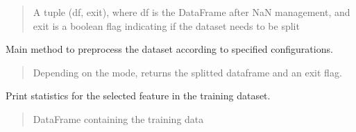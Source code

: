 \documentclass[letterpaper,10pt,english]{sphinxmanual}
\begin{document}
\begin{fulllineitems}
\begin{fulllineitems}
\begin{quote}
\begin{description}
\sphinxAtStartPar
A tuple (df, exit), where df is the DataFrame after NaN management, and exit is a boolean flag indicating if the dataset needs to be split

\end{description}\end{quote}

\end{fulllineitems}


\begin{fulllineitems}
\label{\detokenize{docs/data_preprocessing:data_preprocessing.DataPreprocessor.preprocess_data}}
\pysigstartsignatures
{}
\pysigstopsignatures
\sphinxAtStartPar
Main method to preprocess the dataset according to specified configurations.
\begin{quote}\begin{description}
\sphinxAtStartPar
Depending on the mode, returns the splitted dataframe and an exit flag.

\end{description}\end{quote}

\end{fulllineitems}


\begin{fulllineitems}
\label{\detokenize{docs/data_preprocessing:data_preprocessing.DataPreprocessor.print_stats}}
\pysigstartsignatures
{}
\pysigstopsignatures
\sphinxAtStartPar
Print statistics for the selected feature in the training dataset.
\begin{quote}\begin{description}
\sphinxAtStartPar
{} \textendash{} DataFrame containing the training data

\end{description}\end{quote}


\end{fulllineitems}
\end{fulllineitems}
\end{document}
